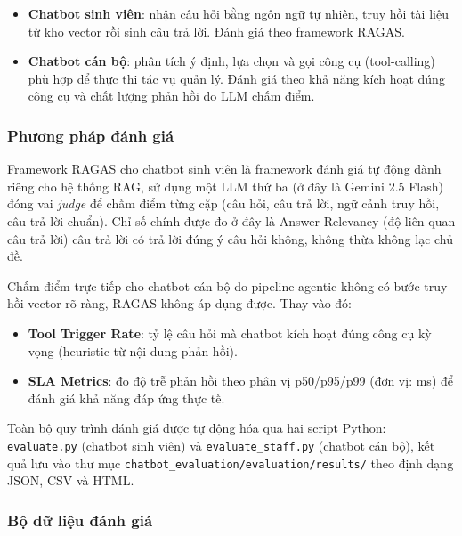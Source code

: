\begin{itemize}
    \item \textbf{Chatbot sinh viên}: nhận câu hỏi bằng ngôn ngữ tự nhiên, truy hồi tài liệu từ kho vector rồi sinh câu trả lời. Đánh giá theo framework RAGAS.
    \item \textbf{Chatbot cán bộ}: phân tích ý định, lựa chọn và gọi công cụ (tool-calling) phù hợp để thực thi tác vụ quản lý. Đánh giá theo khả năng kích hoạt đúng công cụ và chất lượng phản hồi do LLM chấm điểm.
\end{itemize}

\subsubsection{Phương pháp đánh giá}

Framework RAGAS cho chatbot sinh viên là framework đánh giá tự động dành riêng cho hệ thống RAG, sử dụng một LLM thứ ba (ở đây là Gemini 2.5 Flash) đóng vai \emph{judge} để chấm điểm từng cặp (câu hỏi, câu trả lời, ngữ cảnh truy hồi, câu trả lời chuẩn). Chỉ số chính được đo ở đây là Answer Relevancy (độ liên quan câu trả lời) câu trả lời có trả lời đúng ý câu hỏi không, không thừa không lạc chủ đề.

Chấm điểm trực tiếp cho chatbot cán bộ do pipeline agentic không có bước truy hồi vector rõ ràng, RAGAS không áp dụng được. Thay vào đó:

\begin{itemize}
    \item \textbf{Tool Trigger Rate}: tỷ lệ câu hỏi mà chatbot kích hoạt đúng công cụ kỳ vọng (heuristic từ nội dung phản hồi).
    \item \textbf{SLA Metrics}: đo độ trễ phản hồi theo phân vị p50/p95/p99 (đơn vị: ms) để đánh giá khả năng đáp ứng thực tế.
\end{itemize}

Toàn bộ quy trình đánh giá được tự động hóa qua hai script Python:
\texttt{evaluate.py} (chatbot sinh viên) và \texttt{evaluate\_staff.py} (chatbot cán bộ),
kết quả lưu vào thư mục \texttt{chatbot\_evaluation/evaluation/results/} theo định dạng JSON, CSV và HTML.

\subsubsection{Bộ dữ liệu đánh giá}

